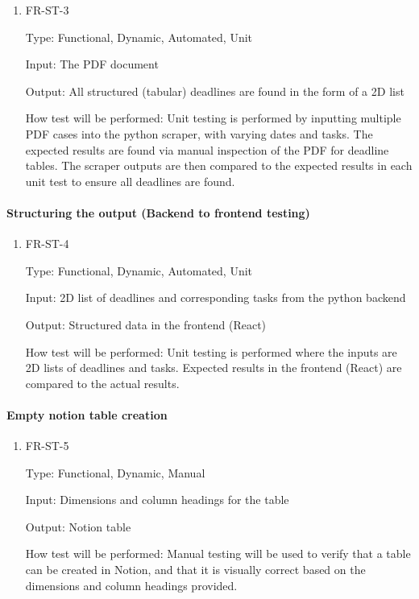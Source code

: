 \documentclass[12pt, titlepage]{article}
\begin{document}
\begin{enumerate}

\item{FR-ST-3\\}

Type: Functional, Dynamic, Automated, Unit 

Input: The PDF document 

Output: All structured (tabular) deadlines are found in the form of a 2D list 

How test will be performed: Unit testing is performed by inputting multiple PDF cases into the python scraper, with varying dates and tasks. The expected results are found via manual inspection of the PDF for deadline tables. The scraper outputs are then compared to the expected results in each unit test to ensure all deadlines are found. 

\end{enumerate}

\paragraph{Structuring the output (Backend to frontend testing)}

\begin{enumerate}

\item{FR-ST-4\\}

Type: Functional, Dynamic, Automated, Unit 

Input: 2D list of deadlines and corresponding tasks from the python backend 

Output: Structured data in the frontend (React) 

How test will be performed: Unit testing is performed where the inputs are 2D lists of deadlines and tasks. Expected results in the frontend (React) are compared to the actual results. 

\end{enumerate}

\paragraph{Empty notion table creation}

\begin{enumerate}

\item{FR-ST-5\\}

Type: Functional, Dynamic, Manual 

Input: Dimensions and column headings for the table 

Output: Notion table 

How test will be performed: Manual testing will be used to verify that a table can be created in Notion, and that it is visually correct based on the dimensions and column headings provided. 

\end{enumerate}
\end{document}
